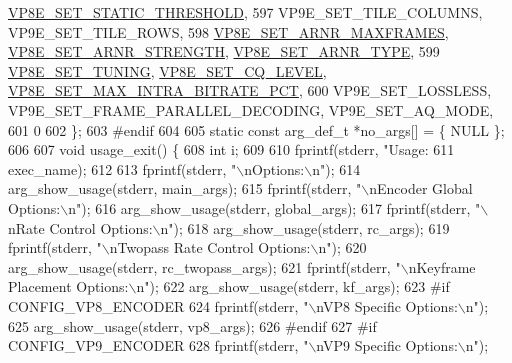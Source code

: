 \begin{DoxyCodeInclude}
{{{{{{{{{      \hyperlink{group__vp8__encoder_gga6deae3d561c838952552c3d3756322ecab34559df04d3d662616300ed0682dcfd}{VP8E\_SET\_STATIC\_THRESHOLD},
597   VP9E\_SET\_TILE\_COLUMNS, VP9E\_SET\_TILE\_ROWS,
598   \hyperlink{group__vp8__encoder_gga6deae3d561c838952552c3d3756322eca628d73f1a69fadd8aa57e0dfef578da8}{VP8E\_SET\_ARNR\_MAXFRAMES}, \hyperlink{group__vp8__encoder_gga6deae3d561c838952552c3d3756322eca0a8c40a768af935ae73faa53355c3244}{VP8E\_SET\_ARNR\_STRENGTH}, 
      \hyperlink{group__vp8__encoder_gga6deae3d561c838952552c3d3756322eca4e0a0af58670012026c213083cd48f3a}{VP8E\_SET\_ARNR\_TYPE},
599   \hyperlink{group__vp8__encoder_gga6deae3d561c838952552c3d3756322eca126ccbe7bde63b59cec5ea68a82dd498}{VP8E\_SET\_TUNING}, \hyperlink{group__vp8__encoder_gga6deae3d561c838952552c3d3756322ecacd4f5b730bddb9788c3d0b82218ec503}{VP8E\_SET\_CQ\_LEVEL}, 
      \hyperlink{group__vp8__encoder_gga6deae3d561c838952552c3d3756322eca09c69ff4a3aabdb307d4f24027dfc4c1}{VP8E\_SET\_MAX\_INTRA\_BITRATE\_PCT},
600   VP9E\_SET\_LOSSLESS, VP9E\_SET\_FRAME\_PARALLEL\_DECODING, VP9E\_SET\_AQ\_MODE,
601   0
602 \};
603 \textcolor{preprocessor}{#endif}
604 
605 \textcolor{keyword}{static} \textcolor{keyword}{const} arg\_def\_t *no\_args[] = \{ NULL \};
606 
607 \textcolor{keywordtype}{void} usage\_exit() \{
608   \textcolor{keywordtype}{int} i;
609 
610   fprintf(stderr, \textcolor{stringliteral}{"Usage: %
611           exec\_name);
612 
613   fprintf(stderr, \textcolor{stringliteral}{"\(\backslash\)nOptions:\(\backslash\)n"});
614   arg\_show\_usage(stderr, main\_args);
615   fprintf(stderr, \textcolor{stringliteral}{"\(\backslash\)nEncoder Global Options:\(\backslash\)n"});
616   arg\_show\_usage(stderr, global\_args);
617   fprintf(stderr, \textcolor{stringliteral}{"\(\backslash\)nRate Control Options:\(\backslash\)n"});
618   arg\_show\_usage(stderr, rc\_args);
619   fprintf(stderr, \textcolor{stringliteral}{"\(\backslash\)nTwopass Rate Control Options:\(\backslash\)n"});
620   arg\_show\_usage(stderr, rc\_twopass\_args);
621   fprintf(stderr, \textcolor{stringliteral}{"\(\backslash\)nKeyframe Placement Options:\(\backslash\)n"});
622   arg\_show\_usage(stderr, kf\_args);
623 \textcolor{preprocessor}{#if CONFIG\_VP8\_ENCODER}
624   fprintf(stderr, \textcolor{stringliteral}{"\(\backslash\)nVP8 Specific Options:\(\backslash\)n"});
625   arg\_show\_usage(stderr, vp8\_args);
626 \textcolor{preprocessor}{#endif}
627 \textcolor{preprocessor}{#if CONFIG\_VP9\_ENCODER}
628   fprintf(stderr, \textcolor{stringliteral}{"\(\backslash\)nVP9 Specific Options:\(\backslash\)n"});
}}}}}}}}}}
\end{DoxyCodeInclude}
